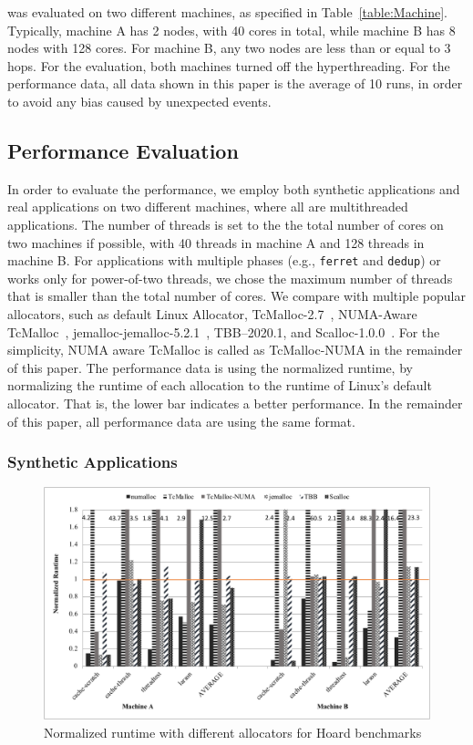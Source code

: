 \NM{} was evaluated on two different machines, as specified in Table~\ref{table:Machine}. Typically, machine A has 2 nodes, with 40 cores in total, while machine B has 8 nodes with 128 cores. For machine B, any two nodes are less than or equal to 3 hops. For the evaluation, both machines turned off the hyperthreading. For the performance data, all data shown in this paper is the average of 10 runs, in order to avoid any bias caused by unexpected events.  

\subsection{Performance Evaluation}

\label{sec:performance}

In order to evaluate the performance, we employ both synthetic applications and real applications on two different machines, where all are multithreaded applications. The number of threads is set to the the total number of cores on two machines if possible, with 40 threads in machine A and 128 threads in machine B. For applications with multiple phases (e.g., \texttt{ferret} and \texttt{dedup}) or works only for power-of-two threads, we chose the maximum number of threads that is smaller than the total number of cores.  We compare \NM{} with multiple popular allocators, such as default Linux Allocator, TcMalloc-2.7~\cite{tcmalloc}, NUMA-Aware TcMalloc~\cite{tcmallocnew}, jemalloc-jemalloc-5.2.1~\cite{jemalloc}, TBB--2020.1, and Scalloc-1.0.0~\cite{Scalloc}. For the simplicity, NUMA aware TcMalloc is called as TcMalloc-NUMA in the remainder of this paper. The performance data is using the normalized runtime, by normalizing the runtime of each allocation to the runtime of Linux's default   allocator. That is, the lower bar indicates a better performance. In the remainder of this paper, all performance data are using the same format. 

\subsubsection{Synthetic Applications}
\label{sec:synthetic}

\begin{figure}[!ht]
    \centering
    \includegraphics[width=\textwidth]{figure/hoard-perf.pdf}
    \caption{Normalized runtime with different allocators for Hoard benchmarks}
    \label{hoard-perf}
\end{figure}


